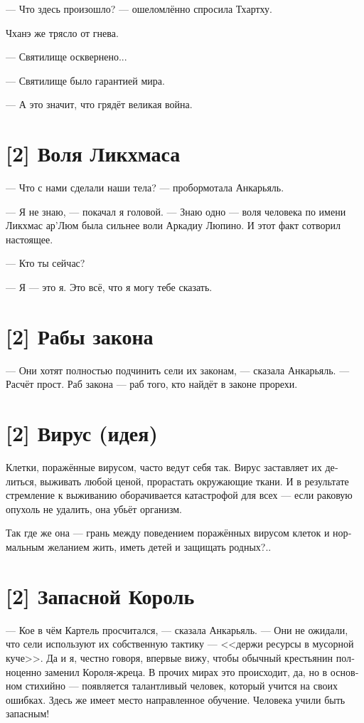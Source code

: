 \documentclass[a4paper,12pt,fleqn]{book}\usepackage{cooltooltips}\usepackage{polyglossia}\setdefaultlanguage[babelshorthands=true]{russian}\setotherlanguage{english}\defaultfontfeatures{Ligatures=TeX,Mapping=tex-text} \usepackage{xcolor}\definecolor{lightgray}{HTML}{bbbbbb}\color{lightgray}\newcommand{\ml}[3]{\textenglish{\textcolor{black}{#3}}}
\newcommand{\textspace}{\vspace{1em}{\centering\Large\bfseries<...>\par}\vspace{1em}}
\begin{document}
{--- Что здесь произошло? --- ошеломлённо спросила Тхартху.

Чханэ же трясло от гнева.

--- Святилище осквернено...

\textspace

--- Святилище было гарантией мира.

--- А это значит, что грядёт великая война.

\section{[2] Воля Ликхмаса}

--- Что с нами сделали наши тела? --- пробормотала Анкарьяль.

--- Я не знаю, --- покачал я головой.
--- Знаю одно --- воля человека по имени Ликхмас ар'Люм была сильнее воли Аркадиу Люпино.
И этот факт сотворил настоящее.

--- Кто ты сейчас?

--- Я --- это я.
Это всё, что я могу тебе сказать.

\section{[2] Рабы закона}

--- Они хотят полностью подчинить сели их законам, --- сказала Анкарьяль.
--- Расчёт прост.
Раб закона --- раб того, кто найдёт в законе прорехи.

\section{[2] Вирус (идея)}

Клетки, поражённые вирусом, часто ведут себя так.
Вирус заставляет их делиться, выживать любой ценой, прорастать окружающие ткани.
И в результате стремление к выживанию оборачивается катастрофой для всех --- если раковую опухоль не удалить, она убьёт организм.

Так где же она --- грань между поведением поражённых вирусом клеток и нормальным желанием жить, иметь детей и защищать родных?..

\section{[2] Запасной Король}

--- Кое в чём Картель просчитался, --- сказала Анкарьяль.
--- Они не ожидали, что сели используют их собственную тактику --- <<держи ресурсы в мусорной куче>>.
Да и я, честно говоря, впервые вижу, чтобы обычный крестьянин полноценно заменил Короля-жреца.
В прочих мирах это происходит, да, но в основном стихийно --- появляется талантливый человек, который учится на своих ошибках.
Здесь же имеет место направленное обучение.
Человека учили быть запасным!

}
\end{document}
